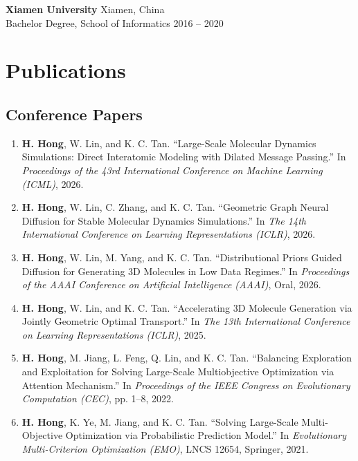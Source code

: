 \documentclass[11pt,a4paper]{article}
\begin{document}
\vspace{0.5em}

\noindent\textbf{Xiamen University} \hfill Xiamen, China\\
Bachelor Degree, School of Informatics \hfill 2016 -- 2020

\section*{Publications}

\subsection*{Conference Papers}

\begin{enumerate}[leftmargin=1.5em]

\item \textbf{H. Hong}, W. Lin, and K. C. Tan. 
\newblock ``Large-Scale Molecular Dynamics Simulations: Direct Interatomic Modeling with Dilated Message Passing.''
\newblock In \textit{Proceedings of the 43rd International Conference on Machine Learning (ICML)}, 2026.

\item \textbf{H. Hong}, W. Lin, C. Zhang, and K. C. Tan.
\newblock ``Geometric Graph Neural Diffusion for Stable Molecular Dynamics Simulations.''
\newblock In \textit{The 14th International Conference on Learning Representations (ICLR)}, 2026.

\item \textbf{H. Hong}, W. Lin, M. Yang, and K. C. Tan.
\newblock ``Distributional Priors Guided Diffusion for Generating 3D Molecules in Low Data Regimes.''
\newblock In \textit{Proceedings of the AAAI Conference on Artificial Intelligence (AAAI)}, Oral, 2026.

\item \textbf{H. Hong}, W. Lin, and K. C. Tan.
\newblock ``Accelerating 3D Molecule Generation via Jointly Geometric Optimal Transport.''
\newblock In \textit{The 13th International Conference on Learning Representations (ICLR)}, 2025.

\item \textbf{H. Hong}, M. Jiang, L. Feng, Q. Lin, and K. C. Tan.
\newblock ``Balancing Exploration and Exploitation for Solving Large-Scale Multiobjective Optimization via Attention Mechanism.''
\newblock In \textit{Proceedings of the IEEE Congress on Evolutionary Computation (CEC)}, pp. 1--8, 2022.

\item \textbf{H. Hong}, K. Ye, M. Jiang, and K. C. Tan.
\newblock ``Solving Large-Scale Multi-Objective Optimization via Probabilistic Prediction Model.''
\newblock In \textit{Evolutionary Multi-Criterion Optimization (EMO)}, LNCS 12654, Springer, 2021.

\end{enumerate}
\end{document}

